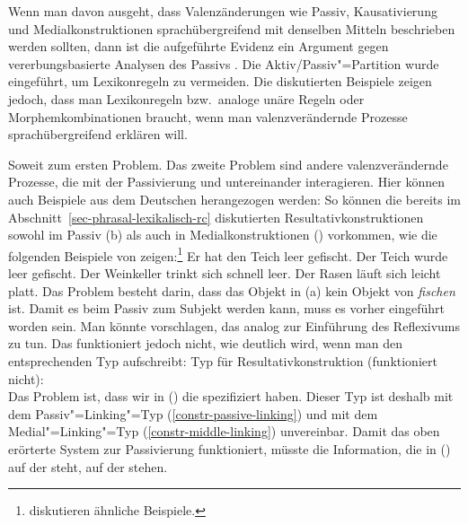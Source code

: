Wenn man davon ausgeht, dass Valenzänderungen wie Passiv, Kausativierung und Medialkonstruktionen
sprachübergreifend mit denselben Mitteln beschrieben werden sollten, dann ist die aufgeführte
Evidenz ein Argument gegen vererbungsbasierte Analysen des Passivs
\citep{Mueller2006d,Mueller2007d}. Die Aktiv/Passiv"=Partition wurde eingeführt, um Lexikonregeln zu
vermeiden. Die diskutierten Beispiele zeigen jedoch, dass man Lexikonregeln bzw.\ analoge unäre
Regeln oder Morphemkombinationen braucht, wenn man valenzverändernde Prozesse sprachübergreifend
erklären will.

Soweit zum ersten Problem. Das zweite Problem sind andere valenzverändernde Prozesse,
die mit der Passivierung und untereinander interagieren. Hier können auch Beispiele aus dem Deutschen
herangezogen werden: So können \zb die bereits im Abschnitt~\ref{sec-phrasal-lexikalisch-rc} diskutierten
Resultativkonstruktionen sowohl im Passiv (b) als auch in Medialkonstruktionen ()
vorkommen, wie die folgenden Beispiele von \citet[]{Wunderlich97c} zeigen:\footnote{
        \citet[]{KR95a} diskutieren ähnliche Beispiele.%
}
\eal
\label{bsp-res-passiv-zwei}
\ex Er hat den Teich leer gefischt.
\ex Der Teich wurde leer gefischt.
\zl
\eal
\label{ex-res-nonselected-obj-passive}
\ex{}
Der Weinkeller  trinkt sich schnell leer.
\ex{}
Der Rasen läuft sich leicht platt.
\zl
\largerpage[2]
Das Problem besteht darin, dass das Objekt in (a) kein Objekt von \emph{fischen} ist.
Damit es beim Passiv zum Subjekt werden kann, muss es vorher eingeführt worden sein. Man könnte
vorschlagen, das analog zur Einführung des Reflexivums zu tun. Das funktioniert jedoch nicht,
wie deutlich wird, wenn man den entsprechenden Typ aufschreibt:
\ea
Typ für Resultativkonstruktion (funktioniert nicht):\\
\z
Das Problem ist, dass wir in () die \compsl spezifiziert haben. Dieser
Typ ist deshalb mit dem Passiv"=Linking"=Typ (\ref{constr-passive-linking}) und mit dem
Medial"=Linking"=Typ (\ref{constr-middle-linking}) unvereinbar. Damit das oben erörterte System zur Passivierung
funktioniert, müsste die Information, die in () auf der \compsl steht, auf der \argstl stehen.

